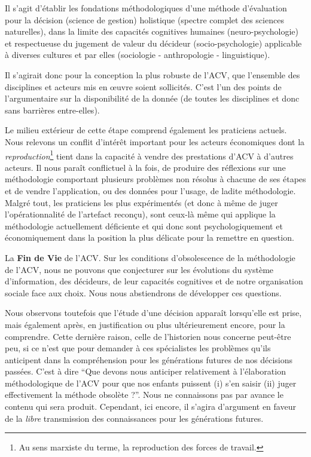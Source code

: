 Il s'agit d'établir les fondations méthodologiques d'une méthode d'évaluation pour la décision (science de gestion) holistique (spectre complet des sciences naturelles), dans la limite des capacités cognitives humaines (neuro-psychologie) et respectueuse du jugement de valeur du décideur (socio-psychologie) applicable à diverses cultures et par elles (sociologie - anthropologie - linguistique).

Il s'agirait donc pour la conception la plus robuste de l'\gls{ACV}, que l'ensemble des disciplines et acteurs mis en œuvre soient sollicités.
C'est l'un des points de l'argumentaire sur la disponibilité de la donnée (de toutes les disciplines et donc sans barrières entre-elles).

Le milieu extérieur de cette étape comprend également les praticiens actuels.
Nous relevons un conflit d'intérêt important pour les acteurs économiques dont la \emph{reproduction}\footnote{Au sens marxiste du terme, la reproduction des forces de travail.} tient dans la capacité à vendre des prestations d'\gls{ACV} à d'autres acteurs.
Il nous paraît conflictuel à la fois, de produire des réflexions sur une méthodologie comportant plusieurs problèmes non résolus à chacune de ses étapes et de vendre l'application, ou des données pour l'usage, de ladite méthodologie.
Malgré tout, les praticiens les plus expérimentés (et donc à même de juger l'opérationnalité de l'artefact reconçu), sont ceux-là même qui applique la méthodologie actuellement déficiente et qui donc sont psychologiquement et économiquement dans la position la plus délicate pour la remettre en question.

La \textbf{Fin de Vie} de l'\gls{ACV}.
Sur les conditions d’obsolescence de la méthodologie de l'\gls{ACV}, nous ne pouvons que conjecturer sur les évolutions du système d'information, des décideurs, de leur capacités cognitives et de notre organisation sociale face aux choix.
Nous nous abstiendrons de développer ces questions.

Nous observons toutefois que l'étude d'une décision apparaît lorsqu'elle est prise, mais également après, en justification ou plus ultérieurement encore, pour la comprendre.
Cette dernière raison, celle de l'historien nous concerne peut-être peu, si ce n'est que pour demander à ces spécialistes les problèmes qu'ils anticipent dans la compréhension pour les générations futures de nos décisions passées.
C'est à dire ``Que devons nous anticiper relativement à l'élaboration méthodologique de l'\gls{ACV} pour que nos enfants puissent (i) s'en saisir (ii) juger effectivement la méthode obsolète ?''.
Nous ne connaissons pas par avance le contenu qui sera produit.
Cependant, ici encore, il s'agira d'argument en faveur de la \emph{libre} transmission des connaissances pour les générations futures.

